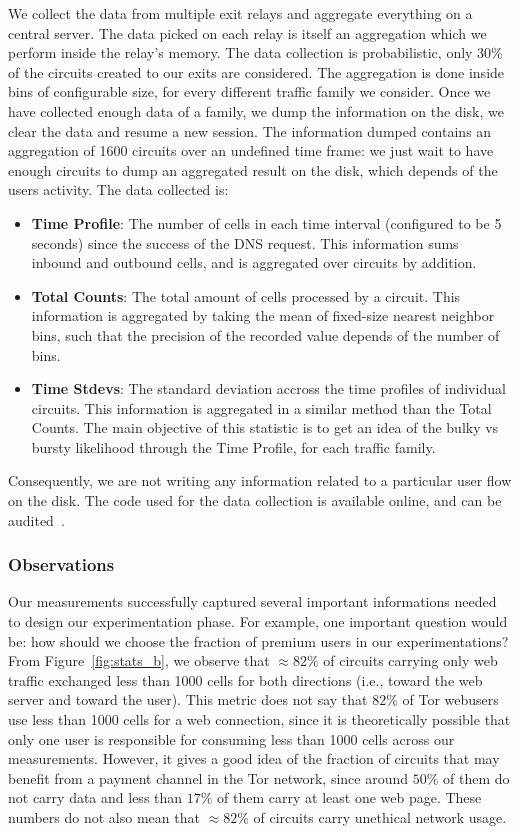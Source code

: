 We collect the data from multiple exit relays and aggregate everything on a central server. The data picked on each relay is itself an aggregation which we perform inside the relay's memory. The data collection is probabilistic, only 30\% of the circuits created to our exits are considered. The aggregation is done inside bins of configurable size, for every different traffic family we consider. Once we have collected enough data of a family, we dump the information on the disk, we clear the data and resume a new session. The information dumped contains an aggregation of 1600 circuits over an undefined time frame: we just wait to have enough circuits to dump an aggregated result on the disk, which depends of the users activity. The data collected is:
\begin{itemize}
	\item \textbf{Time Profile}: The number of cells in each time interval (configured to be 5 seconds) since the success of the DNS request. This information sums inbound and outbound cells, and is aggregated over circuits by addition.
	\item \textbf{Total Counts}: The total amount of cells processed by a circuit. This information is aggregated by taking the mean of fixed-size nearest neighbor bins, such that the precision of the recorded value depends of the number of bins.
	\item \textbf{Time Stdevs}: The standard deviation accross the time profiles of individual circuits. This information is aggregated in a similar method than the Total Counts. The main objective of this statistic is to get an idea of the bulky vs bursty likelihood through the Time Profile, for each traffic family.
\end{itemize}
Consequently, we are not writing any information related to a particular user flow on the disk. The code used for the data collection is available online, and can be audited~\cite{code-mt_stats}.

\subsubsection{Observations}

Our measurements successfully captured several important informations needed to design our experimentation phase. For example, one important question would be: how should we choose the fraction of premium users in our experimentations? From Figure~\ref{fig:stats_b}, we observe that $\approx 82\%$ of circuits carrying only web traffic exchanged less than 1000 cells for both directions (i.e., toward the web server and toward the user). This metric does not say that $82\%$ of Tor webusers use less than 1000 cells for a web connection, since it is theoretically possible that only one user is responsible for consuming less than 1000 cells across our measurements. However, it gives a good idea of the fraction of circuits that may benefit from a payment channel in the Tor network, since around $50\%$ of them do not carry data and less than $17\%$ of them carry at least one web page. These numbers do not also mean that $\approx 82\%$ of circuits carry unethical network usage. 

